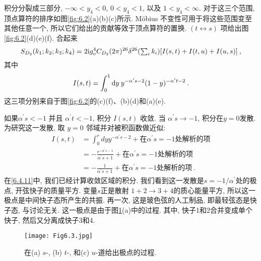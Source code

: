 积分分裂成三部分, $-\infty<y_{4}<0$, $0<y_{4}<1$, 以及 $1<y_{4}<\infty $.  对于这三个范围, 顶点算符的排序如图\ref{fig:6.2}(a)(b)(c)所示. 
M\"{o}bius 不变性可用于将这些范围变至其他任意一个, 所以它们给出的贡献等效于顶点算符的置换.  $(t \leftrightarrow s)$ 项给出图\ref{fig:6.2}(d)(e)(f). 
合起来
\begin{equation}
	S_{D_{2}}(k_{1} ; k_{2} ; k_{3} ; k_{4})=2 \mathrm{i} g_{\mathrm{o}}^{4} C_{D_{2}}(2 \pi)^{26} \delta^{26}({\textstyle\sum_{i} k_{i}})
	[I(s, t)+I(t, u)+I(u, s)] \:, \label{6.4.9}
\end{equation}
其中
\begin{equation}
	I(s, t)=\int_{0}^{1} \mathrm{d} y\: y^{-\alpha^{\prime} s-2}(1-y)^{-\alpha^{\prime} t-2}  \:. \label{6.4.10}
\end{equation}
这三项分别来自于图\ref{fig:6.2}的(c)(f)、(b)(d)和(a)(e).

如果$\alpha^{\prime} s<-1$ 并且 $\alpha^{\prime} t<-1$, 积分 $I(s,t)$ 收敛. 当 $\alpha^{\prime} s \rightarrow-1$, 积分在$y=0$发散. 
为研究这一发散, 取 $y=0$ 邻域并对被积函数做近似:
	\begin{align}
		I(s, t) &=\int_{0}^{r} d y y^{-\alpha^{\prime} s-2}+\text{在$\alpha^{\prime} s=-1$处解析的项}   \nonumber \\
		&=-\frac{r^{-\alpha^{\prime} s-1}}{\alpha^{\prime} s+1}+\text{在$\alpha^{\prime} s=-1$处解析的项} \nonumber\\
		&=-\frac{1}{\alpha^{\prime} s+1}+\text{在$\alpha^{\prime} s=-1$处解析的项} \:. \label{6.4.11}
	\end{align}
在\eqref{6.4.11}中, 我们已经计算收敛区域的积分. 我们看到这一发散是$s=-1 / \alpha^{\prime}$处的极点, 开弦快子的质量平方. 
变量$s$正是散射 $1+2 \rightarrow 3+4$的质心能量平方, 所以这一极点是中间快子态所产生的共振. 再一次, 这是玻色弦的人工制品, 即最轻弦态是快子态, 与讨论无关. 
这一极点是由于图\ref{fig:6.3}(a)中的过程. 其中, 快子1和2合并变成单个快子, 然后又分离成快子3和4.

\begin{figure}[h]
	\begin{center}
		\texttt{[image: Fig6.3.jpg]}\\
		\caption{在(a) $s$-, (b) $t$-, 和(c) $u$-道给出极点的过程.}\label{fig:6.3}
	\end{center}
\end{figure}

